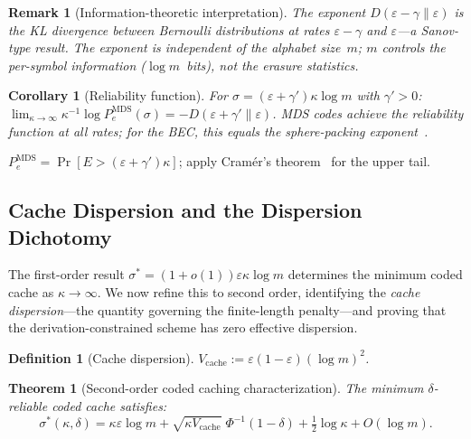 \documentclass[journal]{IEEEtran}
\makeatletter
\newtheorem{theorem}{Theorem}[section]
\newtheorem{corollary}{Corollary}[section]
\newtheorem{definition}{Definition}[section]
\newtheorem{remark}{Remark}[section]
\numberwithin{equation}{section}
\renewenvironment{proof}[1][\proofname]{\par
  \pushQED{\qed}%
  \normalfont \topsep6\p@\@plus6\p@\relax
  \trivlist
  \item[\hskip\labelsep
        \itshape
    #1\@addpunct{.}]\ignorespaces
}{%
  \popQED\endtrivlist\@endpefalse
}
\makeatother
\begin{document}
\begin{remark}[Information-theoretic interpretation]
\label{rem:sc-kl}
The exponent
$D(\varepsilon{-}\gamma\|\varepsilon)$
is the KL divergence between Bernoulli distributions
at rates $\varepsilon{-}\gamma$ and $\varepsilon$---a
Sanov-type result.
The exponent is independent of the alphabet size~$m$;
$m$ controls the per-symbol information ($\log m$~bits),
not the erasure statistics.
\end{remark}

\begin{corollary}[Reliability function]
\label{cor:reliability}
For $\sigma=(\varepsilon{+}\gamma')\kappa\log m$ with
$\gamma'>0$:
$\lim_{\kappa\to\infty}
\kappa^{-1}\log P_e^{\mathrm{MDS}}(\sigma)
=-D(\varepsilon{+}\gamma'\|\varepsilon)$.
MDS codes achieve the reliability function at all rates;
for the BEC, this equals the sphere-packing
exponent~\cite[Theorem~5.8.3]{gallager1968information}.
\end{corollary}

\begin{proof}
$P_e^{\mathrm{MDS}}
=\Pr[E>(\varepsilon{+}\gamma')\kappa]$;
apply Cram\'{e}r's theorem~\cite[Theorem~2.2.3]{dembo2009large}
for the upper tail.
\end{proof}

\subsection{Cache Dispersion and the Dispersion Dichotomy}
\label{subsec:dispersion}

The first-order result
$\sigma^*=(1{+}o(1))\varepsilon\kappa\log m$ determines the
minimum coded cache as $\kappa\to\infty$.
We now refine this to second order, identifying the
\emph{cache dispersion}---the quantity governing the
finite-length penalty---and proving that the
derivation-constrained scheme has zero effective dispersion.

\begin{definition}[Cache dispersion]
\label{def:cache-dispersion}
$V_{\mathrm{cache}}
:=\varepsilon(1{-}\varepsilon)(\log m)^2$.
\end{definition}

\begin{theorem}[Second-order coded caching characterization]
\label{thm:second-order}
The minimum $\delta$-reliable coded cache satisfies:
\begin{equation}\label{eq:second-order}
  \sigma^*(\kappa,\delta)
  =\kappa\varepsilon\log m
  +\sqrt{\kappa V_{\mathrm{cache}}}\;
    \Phi^{-1}(1{-}\delta)
  +\tfrac{1}{2}\log\kappa
  +O(\log m).
\end{equation}
\end{theorem}
\end{document}
